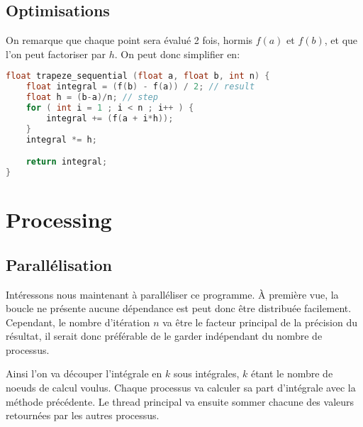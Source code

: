 \documentclass{article}
\begin{document}
\subsection{Optimisations}

On remarque que chaque point sera évalué 2 fois, hormis $f(a)$ et $f(b)$, et que l'on peut factoriser par $h$.
On peut donc simplifier en:

\begin{lstlisting}[language=C, morekeywords={f}]
float trapeze_sequential (float a, float b, int n) {
    float integral = (f(b) - f(a)) / 2; // result
    float h = (b-a)/n; // step
    for ( int i = 1 ; i < n ; i++ ) {
        integral += (f(a + i*h));
    }
    integral *= h;

    return integral;
}
\end{lstlisting}

\newpage
\section{Processing}
\subsection{Parallélisation}

Intéressons nous maintenant à paralléliser ce programme.
À première vue, la boucle ne présente aucune dépendance est peut donc être distribuée facilement.
Cependant, le nombre d'itération $n$ va être le facteur principal de la précision du résultat, il serait donc préférable de le garder indépendant du nombre de processus.

Ainsi l'on va découper l'intégrale en $k$ sous intégrales, $k$ étant le nombre de noeuds de calcul voulus. Chaque processus va calculer sa part d'intégrale avec la méthode précédente. Le thread principal va ensuite sommer chacune des valeurs retournées par les autres processus.
\end{document}
